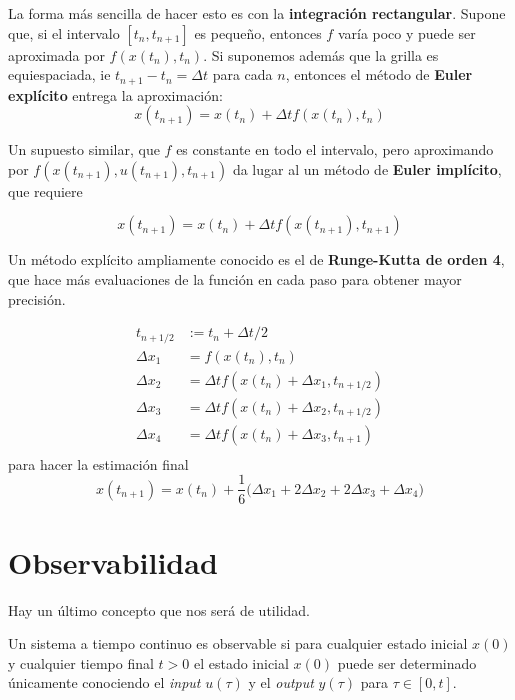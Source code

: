 La forma más sencilla de hacer esto es con la \textbf{integración rectangular}. Supone que, si el intervalo \([t_n, t_{n+1}]\) es pequeño, entonces \(f\) varía poco y puede ser aproximada por \(f(x(t_n), t_n)\). Si suponemos además que la grilla es equiespaciada, ie \( t_{n+1}-t_n = \Delta t \) para cada \(n\), entonces el método de \textbf{Euler explícito} entrega la aproximación: 
\[
x(t_{n+1}) = x(t_n) + \Delta t f(x(t_{n}), t_n)
\]

Un supuesto similar, que \(f\) es constante en todo el intervalo, pero aproximando por \(f(x(t_{n+1}), u(t_{n+1}), t_{n+1})\) da lugar al un método de \textbf{Euler implícito}, que requiere 

\[
x(t_{n+1}) = x(t_n) + \Delta t f(x(t_{n+1}), t_{n+1})
\]

Un método explícito ampliamente conocido es el de \textbf{Runge-Kutta de orden 4}, que hace más evaluaciones de la función en cada paso para obtener mayor precisión. 

\begin{equation}\label{eq:rk4}
\begin{aligned}
t_{n + 1/2} &:= t_n + \Delta t / 2\\
\Delta x_1 &= f(x(t_n), t_n) \\
\Delta x_2 &= \Delta t f(x(t_n) + \Delta x_1, t_{n + 1/2}) \\
\Delta x_3 &= \Delta t f(x(t_n) + \Delta x_2, t_{n + 1/2}) \\
\Delta x_4 &= \Delta t f(x(t_n) + \Delta x_3, t_{n + 1}) \\
\end{aligned}
\end{equation}
para hacer la estimación final 
\[
x(t_{n+1}) = x(t_n) + \frac{1}{6}\Big( \Delta x_1  +  2\Delta x_2 + 2\Delta x_3 +\Delta x_4\Big)
\]

\section{Observabilidad} 

Hay un último concepto que nos será de utilidad.

\begin{defn}[Observabilidad]
Un sistema a tiempo continuo es observable si para cualquier estado inicial \(x(0)\) y cualquier tiempo final \(t > 0\) el estado inicial \(x(0)\) puede ser determinado únicamente conociendo el \textit{input} \(u(\tau)\) y el \textit{output} \(y(\tau)\) para \(\tau \in [0,t]\).
\end{defn}

